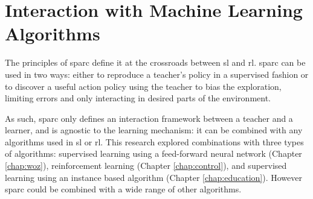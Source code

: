

\section{Interaction with Machine Learning Algorithms}

The principles of \gls{sparc} define it at the crossroads between \acrlong{sl} and \acrlong{rl}. \gls{sparc} can be used in two ways: either to reproduce a teacher's policy in a supervised fashion or to discover a useful action policy using the teacher to bias the exploration, limiting errors and only interacting in desired parts of the environment.

As such, \gls{sparc} only defines an interaction framework between a teacher and a learner, and is agnostic to the learning mechanism: it can be combined with any algorithms used in \acrlong{sl} or \acrlong{rl}. This research explored combinations with three types of algorithms: supervised learning using a feed-forward neural network (Chapter \ref{chap:woz}), reinforcement learning (Chapter \ref{chap:control}), and supervised learning using an instance based algorithm (Chapter \ref{chap:education}). However \gls{sparc} could be combined with a wide range of other algorithms.


